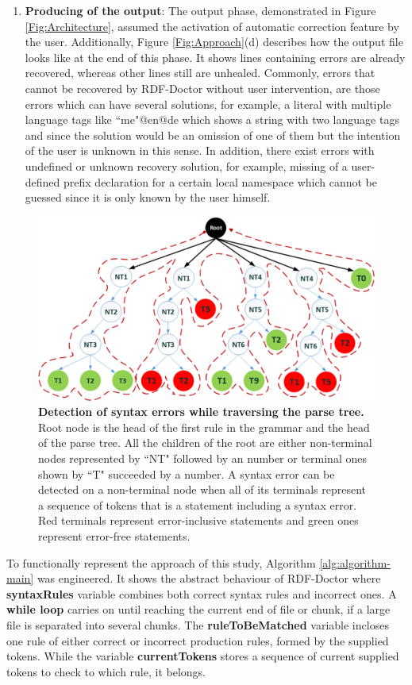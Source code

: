 \begin{enumerate}[label=(\alph*)]
\item\textbf {Producing of the output}: The output phase, demonstrated in Figure \ref{Fig:Architecture}, assumed the activation of automatic correction feature by the user. Additionally, {Figure \ref{Fig:Approach}}(d) describes how the output file looks like at the end of this phase.    It shows lines containing errors are already recovered, whereas other lines still are unhealed. Commonly, errors that cannot be recovered by RDF-Doctor without user intervention, are those errors which can have several solutions, for example, a literal with multiple language tags like ``me"@en@de which shows a string with two language tags and since the solution would be an omission of one of them but the intention of the user is unknown in this sense. In addition, there exist errors with undefined or unknown recovery solution, for example, missing of a user-defined prefix declaration for a certain local namespace which cannot be guessed since it is only known by the user himself. 
\end{enumerate} 
\begin{figure}
	\centering
	  	\includegraphics[width=.8\textwidth]{images/approachParseTree.png}
		\caption{\textbf{Detection of syntax errors while traversing the parse tree.} 
		Root node is the head of the first rule in the grammar and the head of the parse tree.
		All the children of the root are either non-terminal nodes represented by ``NT" followed by an number or  terminal ones shown by ``T" succeeded by a number. 
		A syntax error can be detected on a non-terminal node when all of its terminals represent a sequence of tokens that is a statement including a syntax error. Red terminals represent error-inclusive statements and green ones represent error-free statements.}
		\label{Fig:approachParseTree}  
\end{figure}


To functionally represent the approach of this study, Algorithm \ref{alg:algorithm-main} was engineered. 
It shows the abstract behaviour of RDF-Doctor where \textbf{syntaxRules} variable combines both correct syntax rules and incorrect ones. 
A \textbf{while loop} carries on until reaching the current end of file or chunk, if a large file is separated into several chunks. 
The \textbf{ruleToBeMatched} variable incloses one rule of either correct or incorrect production rules, formed by the supplied tokens. While the variable \textbf{currentTokens} stores a sequence of current supplied tokens to check to which rule, it belongs.  

